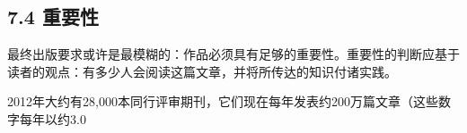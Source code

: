 \subsection*{7.4 重要性}
最终出版要求或许是最模糊的：作品必须具有足够的重要性。重要性的判断应基于读者的观点：有多少人会阅读这篇文章，并将所传达的知识付诸实践。

2012年大约有28,000本同行评审期刊，它们现在每年发表约200万篇文章（这些数字每年以约3.0%

